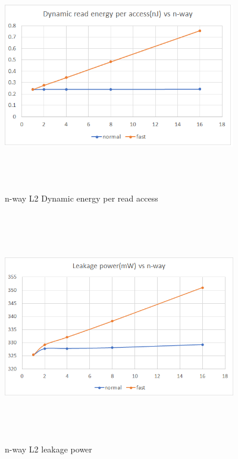 \documentclass{tufte-handout}
\begin{document}
		\begin{figure}[h!]
		\label{fig:dynamicenergy}
		\centering
		\includegraphics[width = 4in, height = 4in]{dynamicenergy}
		\caption{n-way L2 Dynamic energy per read access }
		\end{figure}

		\begin{figure}[h!]
		\label{fig:leakagepower}
		\centering
		\includegraphics[width = 4in, height = 4in]{leakagepower}
		\caption{n-way L2 leakage power }
		\end{figure}
\end{document}
